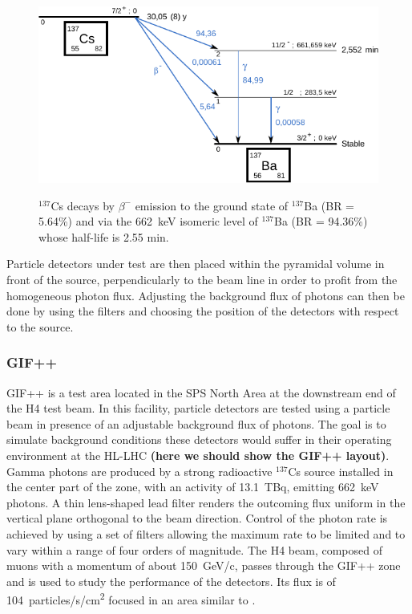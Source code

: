 				\begin{figure}[!h]
				\begin{center}
					\includegraphics[width = \plotwidth]{fig/Cs137.pdf}\\
					\caption{\label{fig:CsSource} $^{137}$Cs decays by $\beta^-$ emission to the ground state of $^{137}$Ba (BR = 5.64\%) and via the \SI{662}{\keV} isomeric level of $^{137}$Ba (BR = 94.36\%) whose half-life is 2.55 min.}
				\end{center}
			\end{figure}
			
			Particle detectors under test are then placed within the pyramidal volume in front of the source, perpendicularly to the beam line in order to profit from the homogeneous photon flux. Adjusting the background flux of photons can then be done by using the filters and choosing the position of the detectors with respect to the source.
			
		
		\subsubsection{GIF++}
		\label{sssec:GIF++}
		
			GIF++ is a test area located in the SPS North Area at the downstream end of the H4 test beam. In this facility, particle detectors are tested using a particle beam in presence of an adjustable background flux of photons. The goal is to simulate background conditions these detectors would suffer in their operating environment at the HL-LHC \textbf{(here we should show the GIF++ layout)}. Gamma photons are produced by a strong radioactive $^{137}$Cs source installed in the center part of the zone, with an activity of \SI{13.1}{TBq}, emitting \SI{662}{\keV} photons. A thin lens-shaped lead filter renders the outcoming flux uniform in the vertical plane orthogonal to the beam direction. Control of the photon rate is achieved by using a set of filters allowing the maximum rate to be limited and to vary within a range of four orders of magnitude. The H4 beam, composed of muons with a momentum of about \SI{150}{GeV/c}, passes through the GIF++ zone and is used to study the performance of the detectors. Its flux is of \SI{104}{particles/s/\square\cm} focused in an area similar to .
		
